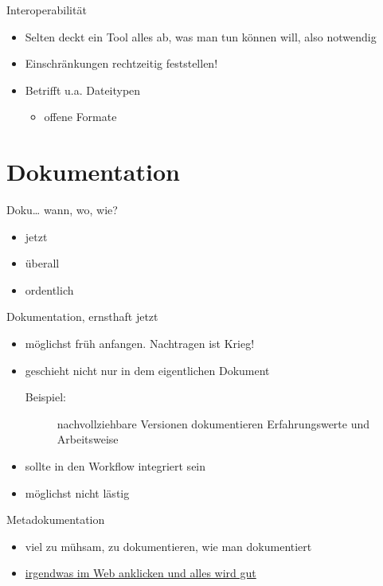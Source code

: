 \documentclass{beamer}
\begin{document}
\begin{frame}
	\begin{block}{Interoperabilität}
		\begin{itemize}
			\item Selten deckt ein Tool alles ab, was man tun können will, also notwendig
			\item Einschränkungen rechtzeitig feststellen!
			\item Betrifft u.a. Dateitypen
			\begin{itemize}
				\item offene Formate
			\end{itemize}
		\end{itemize}
	\end{block}
\end{frame}

\section{Dokumentation}

\begin{frame}
	\begin{block}{Doku… wann, wo, wie?}
		\begin{itemize}
			\pause
			\item jetzt
			\pause
			\item überall
			\pause
			\item ordentlich

		\end{itemize}
	\end{block}
\end{frame}

\begin{frame}
	\begin{block}{Dokumentation, ernsthaft jetzt}
		\begin{itemize}
			\pause
			\item möglichst früh anfangen. Nachtragen ist Krieg!
			\item geschieht nicht nur in dem eigentlichen Dokument
			\begin{description}
				\item[Beispiel:] nachvollziehbare Versionen dokumentieren Erfahrungswerte und Arbeitsweise
			\end{description}
			\item sollte in den Workflow integriert sein
			\item möglichst nicht lästig
		\end{itemize}
	\end{block}
\end{frame}

\begin{frame}
	\begin{block}{Metadokumentation}
		\begin{itemize}
		\item viel zu mühsam, zu dokumentieren, wie man dokumentiert
		\item \href{https://opensource.com/open-organization/17/10/readme-maturity-model?sc_cid=70160000001273HAAQ}{irgendwas im Web anklicken und alles wird gut}
		\end{itemize}
	\end{block}
\end{frame}
\end{document}
